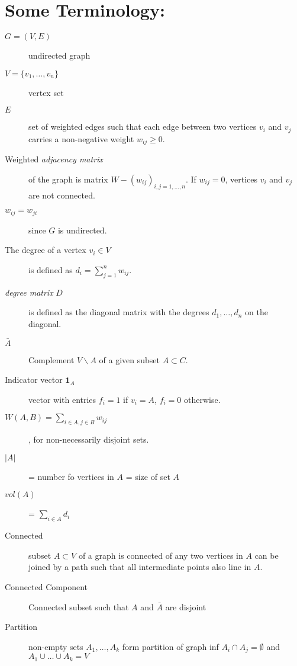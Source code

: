 \documentclass[10pt,a4paper, nocenter]{report}
\begin{document}
		\section{Some Terminology:}
		\begin{description}
			\item[$G=(V,E)$] undirected graph
			\item[$V=\{v_{1},\dots,v_{n}\}$] vertex set
			\item[$E$] set of weighted edges  such that each edge between two vertices $v_{i}$ and $v_{j}$ carries a non-negative weight $w_{ij} \ge 0$. 
			\item[Weighted \textit{adjacency matrix}] of the graph is matrix $W-(w_{ij})_{i,j=1,\dots,n}$. If $w_{ij}=0$, vertices $v_{i}$ and $v_{j}$ are not connected. 
			\item[$w_{ij}=w_{ji}$] since $G$ is undirected. 
			\item[The degree of a vertex $v_{i}\in V$] is defined as $ d_{i} = \sum_{j=1}^{n}w_{ij}$. 
			\item[\textit{degree matrix} $D$] is defined as the diagonal matrix with the degrees $d_{1} ,\dots, d_{n}$ on the diagonal. 
			\item[$\bar{A}$] Complement $V \backslash A$  of a given subset $A \subset C$.
			\item[Indicator vector $\mathbf{1}_{A}$] vector with entries $f_{i} = 1$ if $v_{i}=A$, $f_{i}=0$ otherwise.
			\item[$W(A,B) = \sum_{i\in A, j\in B}w_{ij}$], for non-necessarily disjoint sets. 
			\item[$\lvert A \rvert$] = number fo vertices in $A$ = size of set $A$
			\item[$vol(A)$]  = $\sum_{i\in A}d_{i}$
			\item[Connected] subset $A \subset V$ of a graph is connected of any two vertices in $A$ can be joined by a path such that all intermediate points also line in $A$.
			\item[Connected Component] Connected subset such that $A$ and $\bar{A}$ are disjoint
			\item[Partition] non-empty sets $A_{1},\dots,A_{k}$ form partition of graph inf $A_{i} \cap A_{j} = \emptyset$ and $A_{1}\cup \dots \cup A_{k} = V$
		\end{description}	
	
\end{document}
